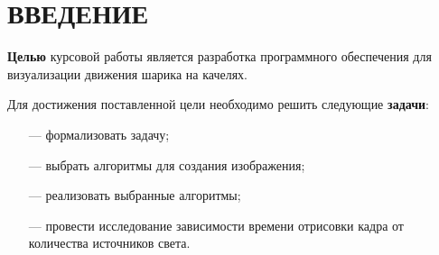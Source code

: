\chapter*{ВВЕДЕНИЕ}

\fontsize{16}{19}\selectfont

\textbf{Целью} курсовой работы является разработка программного обеспечения для визуализации движения шарика на качелях.

Для достижения поставленной цели необходимо решить следующие \textbf{задачи}:

\begin{itemize}
	\item[---] формализовать задачу;
	\item[---] выбрать алгоритмы для создания изображения;
	\item[---] реализовать выбранные алгоритмы; 
	\item[---] провести исследование зависимости времени отрисовки кадра от количества источников света.
\end{itemize}

\pagebreak
